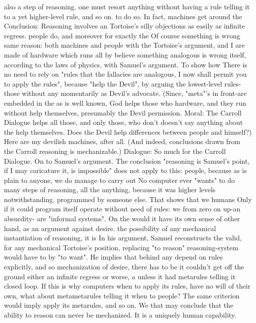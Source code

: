 also a step of reasoning. one must resort    anything without having a rule telling it
to a yet higher-level rule, and so on.       to do so. In fact, machines get around the
Conclusion: Reasoning involves an            Tortoise's silly objections as easily as
infinite regress.                            people do, and moreover for exactly the
         Of course something is wrong        same reason: both machines and people
with the Tortoise's argument, and I          are made of hardware which runs all by
believe something analogous is wrong         itself, according to the laws of physics.
with Samuel's argument. To show how          There is no need to rely on "rules that
the fallacies are analogous, I now shall     permit you to apply the rules", because
"help     the     Devil",   by    arguing    the lowest-level rules-those without any
momentarily as Devil's advocate. (Since,     "meta"'s in front-are embedded in the
as is well known, God helps those who        hardware, and they run without
help themselves, presumably the Devil        permission. Moral: The Carroll Dialogue
helps all those, and only those, who don't   doesn't say anything about the
help themselves. Does the Devil help         differences     between     people    and
himself?) Here are my devilish               machines, after all. (And indeed,
conclusions drawn from the Carroll           reasoning is mechanizable.)
Dialogue:                                             So much for the Carroll
                                             Dialogue. On to Samuel's argument.
   The conclusion "reasoning is              Samuel's point, if I may caricature it, is
   impossible" does not apply to             this:
   people, because as is plain to
   anyone, we do manage to carry out            No computer ever "wants" to do
   many steps of reasoning, all the             anything,   because   it   was
   higher levels notwithstanding.               programmed by someone else.
   That shows that we humans                    Only if it could program itself
   operate without need of rules: we            from zero on up-an absurdity-
   are "informal systems". On the               would it have its own sense of
   other hand, as an argument against           desire.
   the possibility of any mechanical
   instantiation of reasoning, it is         In his argument, Samuel reconstructs the
   valid,     for  any     mechanical        Tortoise's position, replacing "to reason"
   reasoning-system would have to            by "to want". He implies that behind any
   depend on rules explicitly, and so        mechanization of desire, there has to be
   it couldn't get off the ground            either an infinite regress or worse, a
   unless it had metarules telling it        closed loop. If this is why computers
   when to apply its rules,                  have no will of their own, what about
   metametarules telling it when to          people? The same criterion would imply
   apply its metarules, and so on. We        that
   may conclude that the ability to
   reason can never be mechanized. It
   is a uniquely human capability.


